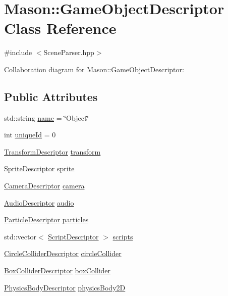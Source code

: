 \hypertarget{class_mason_1_1_game_object_descriptor}{}\section{Mason\+:\+:Game\+Object\+Descriptor Class Reference}
\label{class_mason_1_1_game_object_descriptor}


{\ttfamily \#include $<$Scene\+Parser.\+hpp$>$}



Collaboration diagram for Mason\+:\+:Game\+Object\+Descriptor\+:
\subsection*{Public Attributes}
\begin{DoxyCompactItemize}
\item 
std\+::string \hyperlink{class_mason_1_1_game_object_descriptor_aea3fddf12ef08c91e1f5e422c7521e18}{name} = \char`\"{}Object\char`\"{}
\item 
int \hyperlink{class_mason_1_1_game_object_descriptor_aafbd17cd506939c46ce70b550762e2d1}{unique\+Id} = 0
\item 
\hyperlink{class_mason_1_1_transform_descriptor}{Transform\+Descriptor} \hyperlink{class_mason_1_1_game_object_descriptor_aa22b35eef207a8451a3ad6b816ecd5ac}{transform}
\item 
\hyperlink{class_mason_1_1_sprite_descriptor}{Sprite\+Descriptor} \hyperlink{class_mason_1_1_game_object_descriptor_aa7e89568fa330d9337093a73b63f2d3e}{sprite}
\item 
\hyperlink{class_mason_1_1_camera_descriptor}{Camera\+Descriptor} \hyperlink{class_mason_1_1_game_object_descriptor_a9b2710a89f6a1bb223594a2762340414}{camera}
\item 
\hyperlink{class_mason_1_1_audio_descriptor}{Audio\+Descriptor} \hyperlink{class_mason_1_1_game_object_descriptor_a121843bc6264f0828e8672b1b390b21b}{audio}
\item 
\hyperlink{class_mason_1_1_particle_descriptor}{Particle\+Descriptor} \hyperlink{class_mason_1_1_game_object_descriptor_aa51c7f6f6a4cb0720c352cd504d4593c}{particles}
\item 
std\+::vector$<$ \hyperlink{class_mason_1_1_script_descriptor}{Script\+Descriptor} $>$ \hyperlink{class_mason_1_1_game_object_descriptor_a07c8b975f3306740060a73924c6315a7}{scripts}
\item 
\hyperlink{class_mason_1_1_circle_collider_descriptor}{Circle\+Collider\+Descriptor} \hyperlink{class_mason_1_1_game_object_descriptor_a1ece68a262a9eade1de5f470c1a84778}{circle\+Collider}
\item 
\hyperlink{class_mason_1_1_box_collider_descriptor}{Box\+Collider\+Descriptor} \hyperlink{class_mason_1_1_game_object_descriptor_a81952b9b181c5731b74971fb6510c838}{box\+Collider}
\item 
\hyperlink{class_mason_1_1_physics_body_descriptor}{Physics\+Body\+Descriptor} \hyperlink{class_mason_1_1_game_object_descriptor_a923994ccf28b36e3349e6355d3d0d6bd}{physics\+Body2D}
\end{DoxyCompactItemize}


